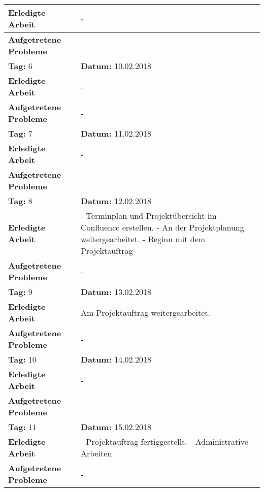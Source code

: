 \begin{longtable}{|p{5cm}|p{5cm}p{6cm}|}
\textbf{Erledigte Arbeit} & \multicolumn{2}{p{11cm}|}{-} \\ \hline
\textbf{Aufgetretene Probleme} & \multicolumn{2}{p{11cm}|}{-} \\ \hline
\rowcolor{heading}\textbf{Tag:} 6 & \textbf{Datum:} 10.02.2018 & \\ \hline
\textbf{Erledigte Arbeit} & \multicolumn{2}{p{11cm}|}{-} \\ \hline
\textbf{Aufgetretene Probleme} & \multicolumn{2}{p{11cm}|}{-} \\ \hline
\rowcolor{heading}\textbf{Tag:} 7 & \textbf{Datum:} 11.02.2018 & \\ \hline
\textbf{Erledigte Arbeit} & \multicolumn{2}{p{11cm}|}{-} \\ \hline
\textbf{Aufgetretene Probleme} & \multicolumn{2}{p{11cm}|}{-} \\ \hline
\rowcolor{heading}\textbf{Tag:} 8 & \textbf{Datum:} 12.02.2018 & \\ \hline
\textbf{Erledigte Arbeit} & \multicolumn{2}{p{11cm}|}{- Terminplan und Projektübersicht im Confluence erstellen. \newline
- An der Projektplanung weitergearbeitet. \newline
- Beginn mit dem Projektauftrag} \\ \hline
\textbf{Aufgetretene Probleme} \newline & \multicolumn{2}{p{11cm}|}{-} \\ \hline
\rowcolor{heading}\textbf{Tag:} 9 & \textbf{Datum:} 13.02.2018 & \\ \hline
\textbf{Erledigte Arbeit} & \multicolumn{2}{p{11cm}|}{Am Projektauftrag weitergearbeitet.} \\ \hline
\textbf{Aufgetretene Probleme} & \multicolumn{2}{p{11cm}|}{-} \\ \hline
\rowcolor{heading}\textbf{Tag:} 10 & \textbf{Datum:} 14.02.2018 & \\ \hline
\textbf{Erledigte Arbeit} & \multicolumn{2}{p{11cm}|}{-} \\ \hline
\textbf{Aufgetretene Probleme} & \multicolumn{2}{p{11cm}|}{-} \\ \hline
\rowcolor{heading}\textbf{Tag:} 11 & \textbf{Datum:} 15.02.2018 & \\ \hline
\textbf{Erledigte Arbeit} & \multicolumn{2}{p{11cm}|}{- Projektauftrag fertiggestellt. \newline
- Administrative Arbeiten} \\ \hline
\textbf{Aufgetretene Probleme} & \multicolumn{2}{p{11cm}|}{-} \\ \hline

\end{longtable}
